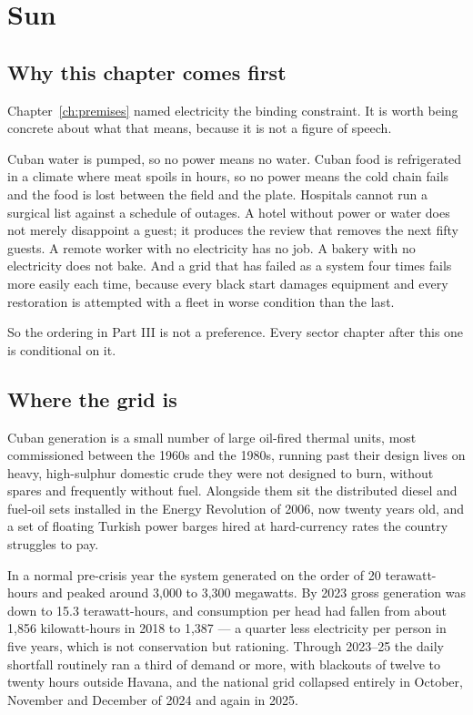 \chapter{Sun}
\label{ch:energy}

\section{Why this chapter comes first}

Chapter~\ref{ch:premises} named electricity the binding constraint. It is worth
being concrete about what that means, because it is not a figure of speech.

Cuban water is pumped, so no power means no water. Cuban food is refrigerated in
a climate where meat spoils in hours, so no power means the cold chain fails and
the food is lost between the field and the plate. Hospitals cannot run a surgical
list against a schedule of outages. A hotel without power or water does not merely
disappoint a guest; it produces the review that removes the next fifty guests. A
remote worker with no electricity has no job. A bakery with no electricity does
not bake. And a grid that has failed as a system four times fails more easily
each time, because every black start damages equipment and every restoration is
attempted with a fleet in worse condition than the last.

So the ordering in Part III is not a preference. Every sector chapter after this
one is conditional on it.

\section{Where the grid is}

Cuban generation is a small number of large oil-fired thermal units, most
commissioned between the 1960s and the 1980s, running past their design lives on
heavy, high-sulphur domestic crude they were not designed to burn, without
spares and frequently without fuel. Alongside them sit the distributed diesel and
fuel-oil sets installed in the Energy Revolution of 2006, now twenty years old,
and a set of floating Turkish power barges hired at hard-currency rates the
country struggles to pay.

In a normal pre-crisis year the system generated on the order of 20 terawatt-
hours and peaked around 3,000 to 3,300 megawatts.\unv{} By 2023 gross
generation was down to 15.3 terawatt-hours, and consumption per head had fallen
from about 1,856 kilowatt-hours in 2018 to 1,387 --- a quarter less electricity
per person in five years, which is not conservation but rationing. Through 2023--25 the
daily shortfall routinely ran a third of demand or more, with blackouts of twelve
to twenty hours outside Havana, and the national grid collapsed entirely in
October, November and December of 2024 and again in 2025.

